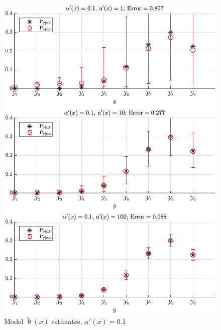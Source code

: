 \documentclass[conference]{IEEEtran}
\begin{document}
\begin{figure}
\centering
\includegraphics[width=1\linewidth]{P_yx_error_a0_0_1.pdf}
\caption{Model $\tilde{\uptheta}(x)$ estimates, $\alpha'(x) = 0.1$}
\label{fig:P_yx_error_a0_0_1}
\end{figure}
\end{document}
